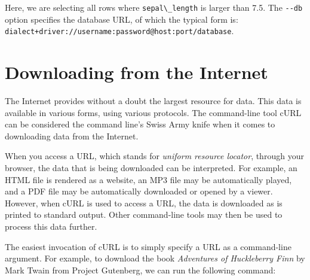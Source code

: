 \documentclass[
]{book}
\newenvironment{Shaded}{\begin{snugshade}}{\end{snugshade}}
\newcommand{\ExtensionTok}[1]{#1}
\newcommand{\NormalTok}[1]{#1}
\newcommand{\OperatorTok}[1]{\textcolor[rgb]{0.81,0.36,0.00}{\textbf{#1}}}
\newcommand{\StringTok}[1]{\textcolor[rgb]{0.31,0.60,0.02}{#1}}
\theoremstyle{definition}
\theoremstyle{definition}
\theoremstyle{definition}
\theoremstyle{remark}
\begin{document}
\begin{Shaded}
\end{Shaded}

Here, we are selecting all rows where \texttt{sepal\textbackslash{}\_length} is larger than 7.5. The \texttt{-\/-db} option specifies the database URL, of which the typical form is: \texttt{dialect+driver://username:password@host:port/database}.

\hypertarget{downloading-from-the-internet}{%
\section{Downloading from the Internet}\label{downloading-from-the-internet}}

The Internet provides without a doubt the largest resource for data. This data is available in various forms, using various protocols. The command-line tool cURL \citep{curl} can be considered the command line's Swiss Army knife when it comes to downloading data from the Internet.

When you access a URL, which stands for \emph{uniform resource locator}, through your browser, the data that is being downloaded can be interpreted. For example, an HTML file is rendered as a website, an MP3 file may be automatically played, and a PDF file may be automatically downloaded or opened by a viewer. However, when cURL is used to access a URL, the data is downloaded as is printed to standard output. Other command-line tools may then be used to process this data further.

The easiest invocation of cURL is to simply specify a URL as a command-line argument. For example, to download the book \emph{Adventures of Huckleberry Finn} by Mark Twain from Project Gutenberg, we can run the following command:
\end{document}
